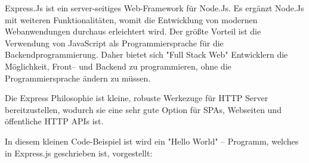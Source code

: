 
Express.Js ist ein server-seitiges Web-Framework für Node.Js. Es ergänzt Node.Js mit weiteren Funktionalitäten, womit die Entwicklung von modernen Webanwendungen durchaus erleichtert wird. Der größte Vorteil ist die Verwendung von JavaScript als Programmiersprache für die Backendprogrammierung. Daher bietet sich "Full Stack Web" Entwicklern die Möglichkeit, Front– und Backend zu programmieren, ohne die Programmiersprache ändern zu müssen. 

Die Express Philosophie ist kleine, robuste Werkezuge für HTTP Server bereitzustellen, wodurch sie eine sehr gute Option für SPAs, Webseiten und öffentliche HTTP APIs ist. \cite{Express}


In diesem kleinen Code-Beispiel ist wird ein "Hello World" – Programm, welches in Express.js geschrieben ist, vorgestellt:

\cite{Express}


